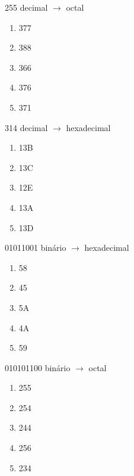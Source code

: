 \bigskip
\begin{minipage}{.45\textwidth}
 \vfill
{\large 255} decimal $\rightarrow$ octal
\begin{enumerate}[\itemlabel]
\item 377 %
\item 388
\item 366
\item 376
\item 371
\end{enumerate}
\end{minipage}\hspace{.075\textwidth}
\begin{minipage}{.4\textwidth}
{\large 314} decimal $\rightarrow$ hexadecimal
\begin{enumerate}[\itemlabel]
\item 13B
\item 13C
\item 12E
\item 13A %
\item 13D
\end{enumerate}
\end{minipage}


\begin{minipage}{.45\textwidth}
 \vfill
{\large 01011001} binário $\rightarrow$ hexadecimal
\begin{enumerate}[\itemlabel]
\item 58
\item 45
\item 5A
\item 4A
\item 59 %
\end{enumerate}
\end{minipage}\hspace{.05\textwidth}
\begin{minipage}{.45\textwidth}
{\large 010101100} binário $\rightarrow$ octal
\begin{enumerate}[\itemlabel]
\item 255
\item 254 %
\item 244
\item 256
\item 234
\end{enumerate}
\end{minipage}

